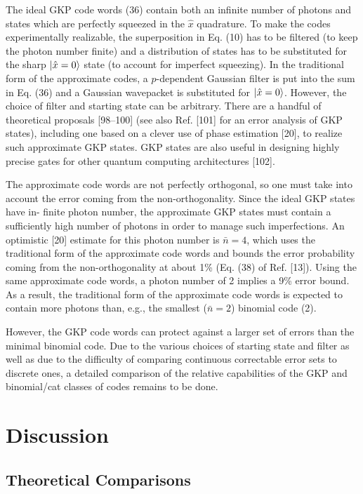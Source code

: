 \documentclass[12]{amsart}
\newcommand\0{\mathbf{0}}
\newcommand\<{\langle}
\renewcommand\>{\rangle}
\begin{document}
The ideal GKP code words (36) contain both an infinite number of photons and states which are perfectly squeezed in the $\hat{x}$ quadrature. To make the codes experimentally realizable, the superposition in Eq. (10) has to be filtered (to keep the photon number finite) and a distribution of states has to be substituted for the sharp $\ket{\hat{x}=0}$ state (to account for imperfect squeezing). In the traditional form of the approximate codes, a $p$-dependent Gaussian filter is put into the sum in Eq. (36) and a Gaussian wavepacket is substituted for $\ket{\hat{x}=0}$. However, the choice of filter and starting state can be arbitrary. There are a handful of theoretical proposals [98–100] (see also Ref. [101] for an error analysis of GKP states), including one based on a clever use of phase estimation [20], to realize such approximate GKP states. GKP states are also useful in designing highly precise gates for other quantum computing architectures [102].

The approximate code words are not perfectly orthogonal, so one must take into account the error coming from the non-orthogonality. Since the ideal GKP states have in- finite photon number, the approximate GKP states must contain a sufficiently high number of photons in order to manage such imperfections. An optimistic [20] estimate for this photon number is $\bar{n} = 4$, which uses the traditional form of the approximate code words and bounds the error probability coming from the non-orthogonality at about 1\% (Eq. (38) of Ref. [13]). Using the same approximate code words, a photon number of 2 implies a 9\% error bound. As a result, the traditional form of the approximate code words is expected to contain more photons than, e.g., the smallest ($\bar{n} = 2$) binomial code (2).

However, the GKP code words can protect against a larger set of errors than the minimal binomial code. Due to the various choices of starting state and filter as well as due to the difficulty of comparing continuous correctable error sets to discrete ones, a detailed comparison of the relative capabilities of the GKP and binomial/cat classes of codes remains to be done.

\section{Discussion}

\subsection{Theoretical Comparisons}
\end{document}
